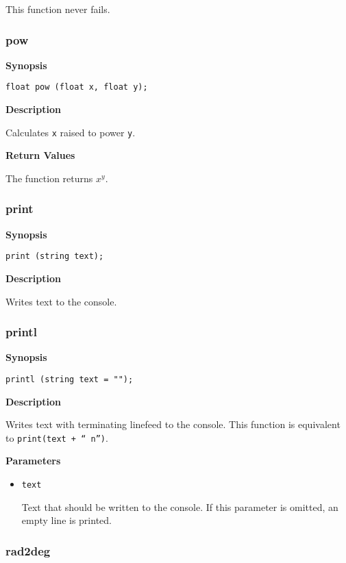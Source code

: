 \documentclass[a4paper, 10pt, titlepage]{article}
\begin{document}
This function never fails.

\subsubsection{pow}

\textbf{Synopsis}

\begin{verbatim}
float pow (float x, float y);
\end{verbatim}

\textbf{Description}

Calculates \texttt{x} raised to power \texttt{y}.

\textbf{Return Values}

The function returns $x^y$.

\subsubsection{print}

\textbf{Synopsis}

\begin{verbatim}
print (string text);
\end{verbatim}

\textbf{Description}

Writes text to the console.

\subsubsection{printl}

\textbf{Synopsis}

\begin{verbatim}
printl (string text = "");
\end{verbatim}

\textbf{Description}

Writes text with terminating linefeed to the console. This function is equivalent to \texttt{print(text + ``\\n'')}.

\textbf{Parameters}

\begin{itemize}
\item \texttt{text}

Text that should be written to the console. If this parameter is omitted, an empty line is printed.
\end{itemize}

\subsubsection{rad2deg}
\end{document}
